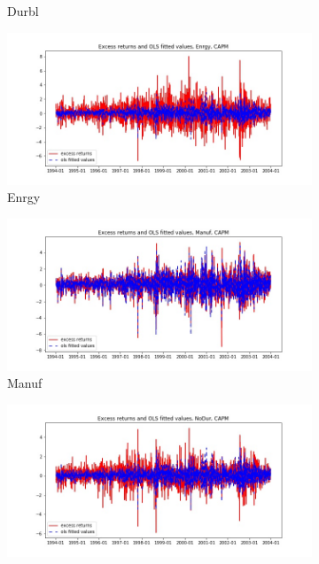 \documentclass{article}
\begin{document}
\begin{figure}
\begin{subfigure}[b]{0.5\textwidth}
    \caption{Durbl}
    \label{fig:2}
  \end{subfigure}
  \begin{subfigure}[b]{0.5\textwidth}
    \centering
    \includegraphics[width=\textwidth]{Enrgy/fitted_CAPM.jpg}
    \caption{Enrgy}
    \label{fig:2}
  \end{subfigure}
  \begin{subfigure}[b]{0.5\textwidth}
    \centering
    \includegraphics[width=\textwidth]{Manuf/fitted_CAPM.jpg}
    \caption{Manuf}
    \label{fig:2}
  \end{subfigure}
  \begin{subfigure}[b]{0.5\textwidth}
    \centering
    \includegraphics[width=\textwidth]{NoDur/fitted_CAPM.jpg}

\end{subfigure}
\end{figure}
\end{document}
